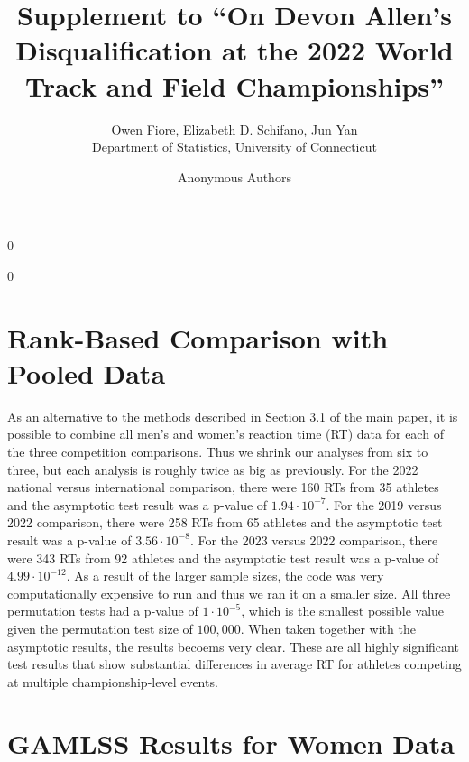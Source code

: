 \documentclass[12pt, letterpaper]{article}
\newcommand{\blind}{0}
\begin{document}
\title{\bf Supplement to ``On Devon Allen's Disqualification at the 2022 World Track and Field Championships''}

\blind
{
  \author{Owen Fiore, %
  Elizabeth D. Schifano, %
  Jun Yan\\[1ex]
  Department of Statistics, University of Connecticut\\
}
} \fi

\blind
{
  \bigskip
  \bigskip
  \bigskip
  \author{Anonymous Authors}
  \bigskip
} \fi

\maketitle 

\section{Rank-Based Comparison with Pooled Data}

As an alternative to the methods described in Section 3.1 of the main paper, it
is possible to combine all men's and women's reaction time (RT) data for each of 
the three competition
comparisons.  Thus we shrink our analyses from six to three, but each analysis
is roughly twice as big as previously.
For the 2022 national versus
international comparison, there were 160 RTs from 35
athletes and the asymptotic test result was a p-value of $1.94 \cdot 10^{-7}$.
For the 2019 versus 2022 comparison,
there were 258 RTs from 65 athletes and the asymptotic
test result was a p-value of $3.56 \cdot 10^{-8}$. 
For the 2023 versus 2022 comparison, there were 343 RTs
from 92 athletes and the asymptotic test result was a p-value of
$4.99 \cdot 10^{-12}$.  As a result of the larger sample sizes, the code was
very computationally expensive to run and thus we ran it on a smaller size.  All
three permutation tests had a p-value of $1 \cdot 10^{-5}$, which is the smallest
possible value given the permutation test size of $100,000$.  When taken together
with the asymptotic results, the results becoems very clear. These are all
highly significant test results that show substantial differences in average RT
for athletes competing at multiple championship-level events.


\section{GAMLSS Results for Women Data}
\end{document}
